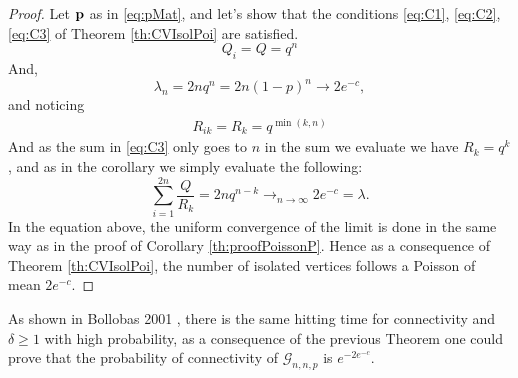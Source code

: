 \begin{proof}
	Let $\bold{p}$ as in \ref{eq:pMat}, and let's show that the conditions \eqref{eq:C1}, \eqref{eq:C2}, \eqref{eq:C3} of Theorem \ref{th:CVIsolPoi} are satisfied. 
	\begin{equation}
		Q_i = Q = q^{n}
	\end{equation}
	And,
	\begin{equation}
		\lambda_n = 2n q^{n}= 2n(1-p)^n \longrightarrow 2 e^{-c},
	\end{equation}
	and noticing 
	\begin{align}
		R_{ik} = R_k = q^{\min(k, n)}
	\end{align}
	And as the sum in \eqref{eq:C3} only goes to $n$ in the sum we evaluate we have $R_k = q^k$, and as in the corollary we simply evaluate the following:
	\begin{equation}
		\sum_{i=1}^{2n} \frac{Q}{R_k} =2n q^{n-k} \longrightarrow_{n\to\infty} 2e^{-c} = \lambda.
	\end{equation}
	In the equation above, the uniform convergence of the limit is done in the same way as in the proof of Corollary \ref{th:proofPoissonP}. 
	Hence as a consequence of Theorem \ref{th:CVIsolPoi}, the number of isolated vertices follows a Poisson of mean $2e^{-c}$.
\end{proof}
As shown in Bollobas 2001 \cite{Bollob01}, there is the same hitting time for connectivity and $\delta \geq 1$ with high probability, as a consequence of the previous Theorem one could prove that the probability of connectivity of $\mathcal{G}_{n,n, p}$ is $e^{-2e^{-c}}$. 


